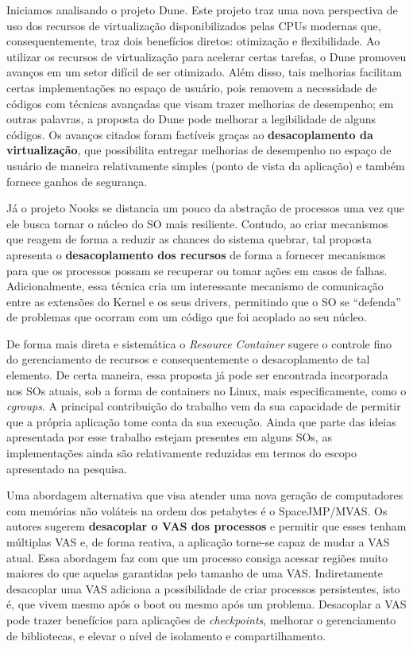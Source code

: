 Iniciamos analisando o projeto Dune. Este projeto traz uma nova perspectiva de uso dos recursos de virtualização
disponibilizados pelas CPUs modernas que, consequentemente, traz dois
benefícios diretos: otimização e flexibilidade. Ao utilizar os recursos de
virtualização para acelerar certas tarefas, o Dune promoveu avanços em um setor
difícil de ser otimizado. Além disso, tais melhorias facilitam certas
implementações no espaço de usuário, pois removem a necessidade de códigos com
técnicas avançadas que visam trazer melhorias de desempenho; em outras
palavras, a proposta do Dune pode melhorar a legibilidade de alguns códigos.
Os avanços citados foram factíveis graças ao \textbf{desacoplamento da
virtualização}, que possibilita entregar melhorias de desempenho no
espaço de usuário de maneira relativamente simples (ponto de vista da
aplicação) e também fornece ganhos de segurança.

Já o projeto Nooks se distancia um pouco da abstração de processos uma vez que
ele busca tornar o núcleo do SO mais resiliente. Contudo, ao criar mecanismos
que reagem de forma a reduzir as chances do sistema quebrar, tal proposta
apresenta o \textbf{desacoplamento dos recursos} de forma a fornecer mecanismos
para que os processos possam se recuperar ou tomar ações em casos de falhas.
Adicionalmente, essa técnica cria um interessante mecanismo de
comunicação entre as extensões do Kernel e os seus drivers, permitindo que o SO
se ``defenda'' de problemas que ocorram com um código que foi acoplado ao seu
núcleo.

De forma mais direta e sistemática o \textit{Resource Container} sugere o
controle fino do gerenciamento de recursos e consequentemente o desacoplamento
de tal elemento. De certa maneira, essa proposta já pode ser encontrada incorporada
nos SOs atuais, sob a forma de containers no Linux, mais especificamente, como o
\textit{cgroups}. A principal contribuição do trabalho vem da sua capacidade
de permitir que a própria aplicação tome conta da sua execução. Ainda que parte
das ideias apresentada por esse trabalho estejam presentes em alguns SOs, as
implementações ainda são relativamente reduzidas em termos do escopo
apresentado na pesquisa.

Uma abordagem alternativa que visa atender uma nova geração de computadores com
memórias não voláteis na ordem dos petabytes é o SpaceJMP/MVAS.  Os autores
sugerem \textbf{desacoplar o VAS dos processos} e permitir que esses tenham
múltiplas VAS e, de forma reativa, a aplicação torne-se capaz de mudar a VAS
atual. Essa abordagem faz com que um processo consiga acessar regiões muito
maiores do que aquelas garantidas pelo tamanho de uma VAS. Indiretamente
desacoplar uma VAS adiciona a possibilidade de criar processos persistentes,
isto é, que vivem mesmo após o boot ou mesmo após um problema. Desacoplar a VAS
pode trazer benefícios para aplicações de \textit{checkpoints}, melhorar o
gerenciamento de bibliotecas, e elevar o nível de isolamento e compartilhamento.

